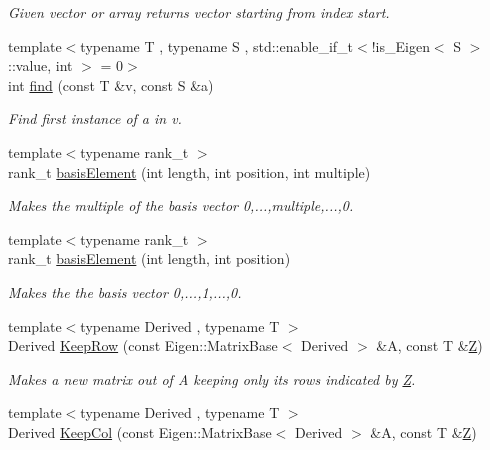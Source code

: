 \begin{DoxyCompactItemize}
\begin{DoxyCompactList}\small\item\em Given vector or array returns vector starting from index start. \end{DoxyCompactList}\item 
{\footnotesize template$<$typename T , typename S , std\+::enable\+\_\+if\+\_\+t$<$!is\+\_\+\+Eigen$<$ S $>$\+::value, int $>$  = 0$>$ }\\int \hyperlink{namespaceMackey_a91104eaef1ab349e68f0623cfaaf45c0}{find} (const T \&v, const S \&a)
\begin{DoxyCompactList}\small\item\em Find first instance of a in v. \end{DoxyCompactList}\item 
{\footnotesize template$<$typename rank\+\_\+t $>$ }\\rank\+\_\+t \hyperlink{namespaceMackey_ac2e368bf7d802f2fc47e39a71a5a1630}{basis\+Element} (int length, int position, int multiple)
\begin{DoxyCompactList}\small\item\em Makes the multiple of the basis vector 0,...,multiple,...,0. \end{DoxyCompactList}\item 
{\footnotesize template$<$typename rank\+\_\+t $>$ }\\rank\+\_\+t \hyperlink{namespaceMackey_aa10c6cbea565e024a38b446139800b69}{basis\+Element} (int length, int position)
\begin{DoxyCompactList}\small\item\em Makes the the basis vector 0,...,1,...,0. \end{DoxyCompactList}\item 
{\footnotesize template$<$typename Derived , typename T $>$ }\\Derived \hyperlink{namespaceMackey_abb970fabb37932c8d2084fb9cd1aff3f}{Keep\+Row} (const Eigen\+::\+Matrix\+Base$<$ Derived $>$ \&A, const T \&\hyperlink{classZ}{Z})
\begin{DoxyCompactList}\small\item\em Makes a new matrix out of A keeping only its rows indicated by \hyperlink{classZ}{Z}. \end{DoxyCompactList}\item 
{\footnotesize template$<$typename Derived , typename T $>$ }\\Derived \hyperlink{namespaceMackey_a165eecd4244c7e736cd453016a80ec29}{Keep\+Col} (const Eigen\+::\+Matrix\+Base$<$ Derived $>$ \&A, const T \&\hyperlink{classZ}{Z})

\end{DoxyCompactItemize}
